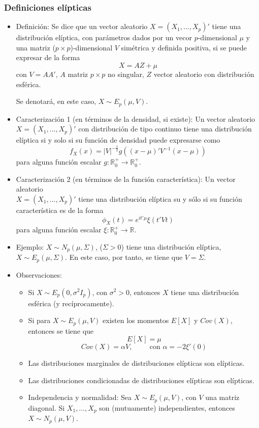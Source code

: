 \documentclass[11pt,a4paper]{article}
\begin{document}
\subsubsection{Definiciones elípticas}
\begin{itemize}
\item Definición: Se dice que un vector aleatorio $X = (X_{1}, \dots, X_{p})'$ tiene una distribución elíptica, con parámetros dados por un vecor $p$-dimensional $\mu$ y una matriz ($p \times p$)-dimensional $V$ simétrica y definida positiva, si se puede expresar de la forma
$$X = AZ + \mu$$
con $V = AA'$, $A$ matriz $p \times p$ no singular, $Z$ vector aleatorio con distribución esférica.

Se denotará, en este caso, $X \sim E_{p}(\mu, V)$.

\item Caracterización 1 (en términos de la densidad, si existe): Un vector aleatorio $X = (X_{1}, \dots, X_{p})'$ con distribución de tipo continuo tiene una distribución elíptica si y solo si su función de densidad puede expresarse como
$$f_{X}(x) = |V|^{-\frac{1}{2}}g((x-\mu)'V^{-1}(x-\mu))$$
para alguna función escalar $g: \mathbb{R}_{0}^{+} \to \mathbb{R}_{0}^{+}$.

\item Caracterización 2 (en términos de la función característica): Un vector aleatorio \\ $X = (X_{1}, \dots, X_{p})'$ tiene una distribución elíptica su y sólo si su función característica es de la forma
$$\phi_{X}(t) = e^{it'\mu}\xi(t'Vt)$$
para alguna función escalar $\xi: \mathbb{R}_{0}^{+} \to \mathbb{R}$.

\item Ejemplo: $X \sim N_{p}(\mu, \Sigma)$, ($\Sigma > 0$) tiene una distribución elíptica, $X \sim E_{p}(\mu, \Sigma)$. En este caso, por tanto, se tiene que $V = \Sigma$.

\item Observaciones:
\begin{itemize}
\item Si $X \sim E_{p}(0, \sigma^{2}I_{p})$, con $\sigma^{2} > 0$, entonces $X$ tiene una distribución esférica (y recíprocamente).

\item Si para $X \sim E_{p}(\mu, V)$ existen los momentos $E[X]$ y $Cov(X)$, entonces se tiene que
$$E[X] = \mu$$
$$Cov(X) = \alpha V, \hspace{1cm} \text{con } \alpha = -2\xi'(0)$$

\item Las distribuciones marginales de distribuciones elípticas son elípticas.

\item Las distribuciones condicionadas de distribuciones elípticas son elípticas.

\item Independencia y normalidad: Sea $X \sim E_{p}(\mu, V)$, con $V$ una matriz diagonal. Si $X_{1}, \dots, X_{p}$ son (mutuamente) independientes, entonces $X \sim N_{p}(\mu, V)$.
\end{itemize}
\end{itemize}
\end{document}
